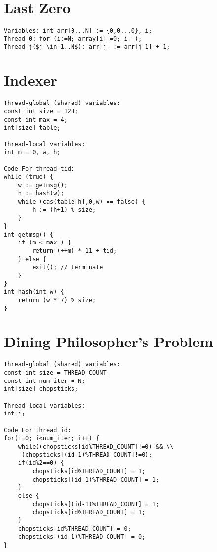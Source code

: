 \section{Last Zero}
\begin{lstlisting}[mathescape=true,style=customc,caption={Last Zero Program based on \citet{abdulla2014optimal}},label={code_lastzero}]
Variables: int arr[0...N] := {0,0..,0}, i;
Thread 0: for (i:=N; array[i]!=0; i--);
Thread j($j \in 1..N$): arr[j] := arr[j-1] + 1;
\end{lstlisting}

\section{Indexer}
\begin{lstlisting}[style=customc,caption={Indexer Program based on \citet{dynamic_por}},label={code_indexer}]
Thread-global (shared) variables:
const int size = 128;
const int max = 4;
int[size] table;

Thread-local variables:
int m = 0, w, h;

Code For thread tid:
while (true) {
	w := getmsg();
	h := hash(w);
	while (cas(table[h],0,w) == false) {
		h := (h+1) % size;
	}
}
int getmsg() {
	if (m < max ) {
		return (++m) * 11 + tid;
	} else {
		exit(); // terminate
	}
}
int hash(int w) {
	return (w * 7) % size;
}
\end{lstlisting}
\newpage
\section{Dining Philosopher's Problem}

\begin{lstlisting}[style=customc,caption={Dining Philosopher's Problem Program},label={code_dining_phil}]
Thread-global (shared) variables:
const int size = THREAD_COUNT;
const int num_iter = N;
int[size] chopsticks;

Thread-local variables:
int i;

Code For thread id:
for(i=0; i<num_iter; i++) {
	while((chopsticks[id%THREAD_COUNT]!=0) && \\
	 (chopsticks[(id-1)%THREAD_COUNT]!=0);
	if(id%2==0) {
		chopsticks[id%THREAD_COUNT] = 1;
		chopsticks[(id-1)%THREAD_COUNT] = 1;
	}
	else {
		chopsticks[(id-1)%THREAD_COUNT] = 1;
		chopsticks[id%THREAD_COUNT] = 1;
	}
	chopsticks[id%THREAD_COUNT] = 0;
	chopsticks[(id-1)%THREAD_COUNT] = 0;
}
\end{lstlisting}

